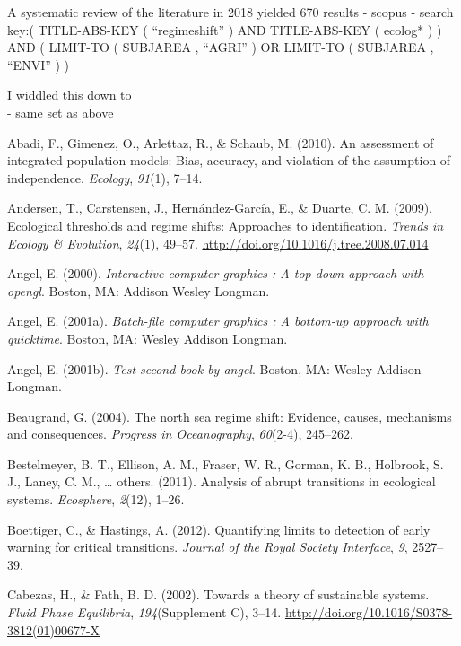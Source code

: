 \documentclass[12pt,twoside]{reedthesis}
\begin{document}
A systematic review of the literature in 2018 yielded 670 results
- scopus
- search key:( TITLE-ABS-KEY ( ``regimeshift'' ) AND TITLE-ABS-KEY ( ecolog* ) ) AND ( LIMIT-TO ( SUBJAREA , ``AGRI'' ) OR LIMIT-TO ( SUBJAREA , ``ENVI'' ) )

I widdled this down to\\
- same set as above

\hypertarget{refs}{}
\leavevmode\hypertarget{ref-abadi2010assessment}{}%
Abadi, F., Gimenez, O., Arlettaz, R., \& Schaub, M. (2010). An assessment of integrated population models: Bias, accuracy, and violation of the assumption of independence. \emph{Ecology}, \emph{91}(1), 7--14.

\leavevmode\hypertarget{ref-andersen_ecological_2009}{}%
Andersen, T., Carstensen, J., Hernández-García, E., \& Duarte, C. M. (2009). Ecological thresholds and regime shifts: Approaches to identification. \emph{Trends in Ecology \& Evolution}, \emph{24}(1), 49--57. \url{http://doi.org/10.1016/j.tree.2008.07.014}

\leavevmode\hypertarget{ref-angel2000}{}%
Angel, E. (2000). \emph{Interactive computer graphics : A top-down approach with opengl}. Boston, MA: Addison Wesley Longman.

\leavevmode\hypertarget{ref-angel2001}{}%
Angel, E. (2001a). \emph{Batch-file computer graphics : A bottom-up approach with quicktime}. Boston, MA: Wesley Addison Longman.

\leavevmode\hypertarget{ref-angel2002a}{}%
Angel, E. (2001b). \emph{Test second book by angel}. Boston, MA: Wesley Addison Longman.

\leavevmode\hypertarget{ref-beaugrand2004north}{}%
Beaugrand, G. (2004). The north sea regime shift: Evidence, causes, mechanisms and consequences. \emph{Progress in Oceanography}, \emph{60}(2-4), 245--262.

\leavevmode\hypertarget{ref-bestelmeyer_analysis_2011}{}%
Bestelmeyer, B. T., Ellison, A. M., Fraser, W. R., Gorman, K. B., Holbrook, S. J., Laney, C. M., \ldots{} others. (2011). Analysis of abrupt transitions in ecological systems. \emph{Ecosphere}, \emph{2}(12), 1--26.

\leavevmode\hypertarget{ref-boettiger_quantifying_2012}{}%
Boettiger, C., \& Hastings, A. (2012). Quantifying limits to detection of early warning for critical transitions. \emph{Journal of the Royal Society Interface}, \emph{9}, 2527--39.

\leavevmode\hypertarget{ref-cabezas_towards_2002}{}%
Cabezas, H., \& Fath, B. D. (2002). Towards a theory of sustainable systems. \emph{Fluid Phase Equilibria}, \emph{194}(Supplement C), 3--14. \url{http://doi.org/10.1016/S0378-3812(01)00677-X}
\end{document}
